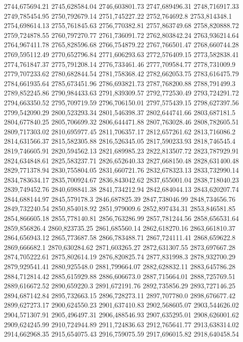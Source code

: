 2744,675694.21
2745,628584.04
2746,603801.73
2747,689496.31
2748,716917.33
2749,785454.95
2750,792679.14
2751,745227.22
2752,764692.8
2753,814348.1
2754,698614.13
2755,761845.63
2756,770382.81
2757,863749.68
2758,820888.72
2759,724878.55
2760,797270.77
2761,736091.72
2762,803842.24
2763,936214.64
2764,967411.78
2765,828596.68
2766,754879.22
2767,766501.47
2768,660744.28
2769,595112.49
2770,652796.84
2771,606293.63
2772,576409.15
2773,582838.41
2774,761847.37
2775,791208.14
2776,733461.46
2777,709584.77
2778,731009.9
2779,707233.62
2780,682844.54
2781,758368.42
2782,662053.75
2783,616475.79
2784,661935.64
2785,673451.96
2786,693821.73
2787,768200.88
2788,791499.3
2789,852245.86
2790,984433.63
2791,839309.57
2792,772530.49
2793,724291.72
2794,663350.52
2795,709719.59
2796,706150.01
2797,575439.15
2798,627397.56
2799,542090.29
2800,523293.34
2801,546398.37
2802,644741.66
2803,687181.5
2804,677840.25
2805,706699.32
2806,644471.88
2807,763028.46
2808,782605.51
2809,717303.02
2810,695977.45
2811,706357.17
2812,657261.62
2813,716086.2
2814,631566.37
2815,582305.88
2816,526345.05
2817,590233.93
2818,746545.4
2819,746605.91
2820,594562.13
2821,689985.23
2822,813507.72
2823,787929.91
2824,634848.61
2825,583237.71
2826,652640.33
2827,668150.48
2828,631400.48
2829,771378.94
2830,755804.05
2831,660721.76
2832,678323.13
2833,732990.14
2834,783634.17
2835,700924.67
2836,843042.62
2837,655001.04
2838,718040.23
2839,749452.76
2840,698841.38
2841,734212.94
2842,684044.13
2843,620207.74
2844,688144.97
2845,579178.3
2846,687825.39
2847,738046.99
2848,734656.76
2849,732240.54
2850,854018.92
2851,979009.6
2852,897434.31
2853,846581.85
2854,866605.18
2855,778140.81
2856,763286.99
2857,781244.56
2858,656531.64
2859,856826.4
2860,823735.25
2861,685560.14
2862,618270.16
2863,661810.37
2864,656943.12
2865,773687.58
2866,783488.71
2867,724111.41
2868,659622.8
2869,666682.1
2870,630284.62
2871,603265.27
2872,631307.55
2873,697667.28
2874,705222.61
2875,802614.19
2876,820825.74
2877,831998.3
2878,932700.29
2879,929541.41
2880,925548.0
2881,799664.07
2882,628832.11
2883,645786.28
2884,712814.42
2885,615929.88
2886,606673.0
2887,715664.01
2888,725769.51
2889,616672.52
2890,659220.3
2891,672191.76
2892,735856.29
2893,727146.25
2894,687142.84
2895,732663.15
2896,728273.11
2897,707780.0
2898,676677.42
2899,627273.17
2900,624550.23
2901,637410.83
2902,568605.07
2903,544626.02
2904,571307.91
2905,496497.31
2906,488546.93
2907,635295.01
2908,626001.62
2909,624245.99
2910,724944.89
2911,724836.63
2912,765641.77
2913,638314.02
2914,662968.35
2915,654075.43
2916,759075.59
2917,696015.82
2918,640458.54
